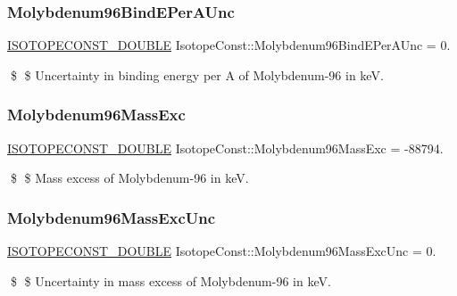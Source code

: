 \subsubsection{\texorpdfstring{Molybdenum96\+Bind\+E\+Per\+A\+Unc}{Molybdenum96BindEPerAUnc}}
{\footnotesize\ttfamily \mbox{\hyperlink{group___isotope_const-_macros_ga8f45a7272ce02c0b4c65c44636ed719a}{I\+S\+O\+T\+O\+P\+E\+C\+O\+N\+S\+T\+\_\+\+D\+O\+U\+B\+LE}} Isotope\+Const\+::\+Molybdenum96\+Bind\+E\+Per\+A\+Unc = 0.}

\$ \$ Uncertainty in binding energy per A of Molybdenum-\/96 in keV. \mbox{\label{group___isotope_const-_molybdenum-_mo96_ga0ecd14e6123bb4533e744ad9a02bcd7e}} 
\subsubsection{\texorpdfstring{Molybdenum96\+Mass\+Exc}{Molybdenum96MassExc}}
{\footnotesize\ttfamily \mbox{\hyperlink{group___isotope_const-_macros_ga8f45a7272ce02c0b4c65c44636ed719a}{I\+S\+O\+T\+O\+P\+E\+C\+O\+N\+S\+T\+\_\+\+D\+O\+U\+B\+LE}} Isotope\+Const\+::\+Molybdenum96\+Mass\+Exc = -\/88794.}

\$ \$ Mass excess of Molybdenum-\/96 in keV. \mbox{\label{group___isotope_const-_molybdenum-_mo96_ga3b4bb77c6d2af358c4b622d0e866ba4b}} 
\subsubsection{\texorpdfstring{Molybdenum96\+Mass\+Exc\+Unc}{Molybdenum96MassExcUnc}}
{\footnotesize\ttfamily \mbox{\hyperlink{group___isotope_const-_macros_ga8f45a7272ce02c0b4c65c44636ed719a}{I\+S\+O\+T\+O\+P\+E\+C\+O\+N\+S\+T\+\_\+\+D\+O\+U\+B\+LE}} Isotope\+Const\+::\+Molybdenum96\+Mass\+Exc\+Unc = 0.}

\$ \$ Uncertainty in mass excess of Molybdenum-\/96 in keV. \mbox{\label{group___isotope_const-_molybdenum-_mo96_ga7b92cfb8adf6800f55ad084fb535d7b6}} 
